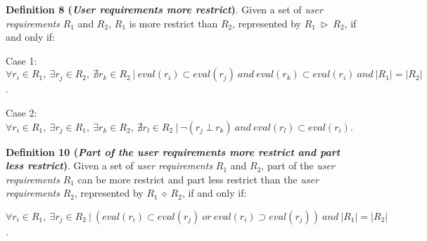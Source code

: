 \bigskip
\noindent \textbf{Definition 8 (\textsl{User requirements more restrict})}.
Given a set of \textsl{user requirements} $R_{1}$ and $R_{2}$, $R_{1}$ is more restrict than $R_{2}$, represented by $R_{1} \ \rhd \ R_{2}$, if and only if:
\begin{flushleft}
Case 1: $\forall r_{i} \in R_{1}, \ \exists r_{j} \in R_{2}, \ \nexists r_{k} \in R_{2} \ \vert \ eval (r_{i}) \subset eval(r_{j}) \ and \ eval (r_{k}) \subset eval(r_{i}) \ and \ \vert R_{1} \vert = \vert R_{2} \vert$.
\end{flushleft}
\begin{flushleft}
Case 2: $\forall r_{i} \in R_{1}, \ \exists r_{j} \in R_{1}, \ \exists r_{k} \in R_{2}, \ \nexists r_{l} \in R_{2} \ \vert \ \neg (r_{j} \ \bot \ r_{k}) \ and \ eval (r_{l}) \subset eval(r_{i})$.
\end{flushleft}


\bigskip
\noindent \textbf{Definition 10 (\textsl{Part of the user requirements more restrict and part less restrict})}.
Given a set of \textsl{user requirements} $R_{1}$ and $R_{2}$, part of the \textsl{user requirements} $R_{1}$ can be more restrict and part less restrict than the \textsl{user requirements} $R_{2}$, represented by $R_{1} \ \diamond \ R_{2}$, if and only if:
\begin{flushleft}
$\forall r_{i} \in R_{1}, \ \exists r_{j} \in R_{2} \ \vert \ (eval (r_{i}) \subset eval(r_{j}) \ or \ eval (r_{i}) \supset eval(r_{j})) \ and \ \vert R_{1} \vert = \vert R_{2} \vert$.
\end{flushleft}


